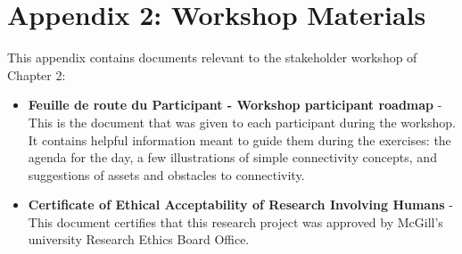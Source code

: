 
\chapter*{\textbf{Appendix 2: Workshop Materials \\ \hspace{1em}}}

\setcounter{chapter}{4}
\setcounter{table}{0}
\setcounter{figure}{0}

This appendix contains documents relevant to the stakeholder workshop of Chapter 2: 
\begin{itemize}
  \item \textbf{Feuille de route du Participant - Workshop participant roadmap} - This is the document that was given to each participant during the workshop. It contains helpful information meant to guide them during the exercises: the agenda for the day, a few illustrations of simple connectivity concepts, and suggestions of assets and obstacles to connectivity.
  \item \textbf{Certificate of Ethical Acceptability of Research Involving Humans} - This document certifies that this research project was approved by McGill's university Research Ethics Board Office.
\end{itemize}


% 
